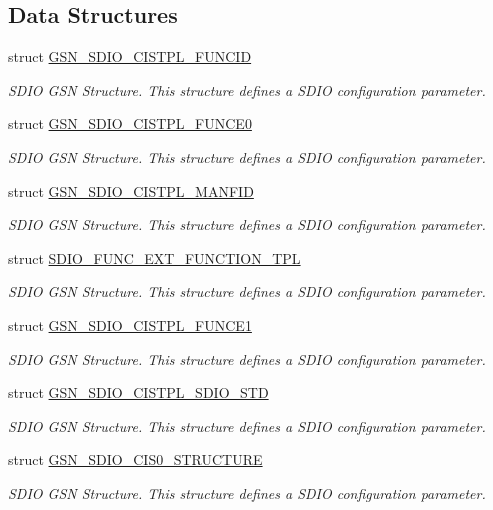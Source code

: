 \subsection*{Data Structures}
\begin{DoxyCompactItemize}
\item 
struct \hyperlink{a00221}{GSN\_\-SDIO\_\-CISTPL\_\-FUNCID}
\begin{DoxyCompactList}\small\item\em SDIO GSN Structure. This structure defines a SDIO configuration parameter. \end{DoxyCompactList}\item 
struct \hyperlink{a00219}{GSN\_\-SDIO\_\-CISTPL\_\-FUNCE0}
\begin{DoxyCompactList}\small\item\em SDIO GSN Structure. This structure defines a SDIO configuration parameter. \end{DoxyCompactList}\item 
struct \hyperlink{a00222}{GSN\_\-SDIO\_\-CISTPL\_\-MANFID}
\begin{DoxyCompactList}\small\item\em SDIO GSN Structure. This structure defines a SDIO configuration parameter. \end{DoxyCompactList}\item 
struct \hyperlink{a00458}{SDIO\_\-FUNC\_\-EXT\_\-FUNCTION\_\-TPL}
\begin{DoxyCompactList}\small\item\em SDIO GSN Structure. This structure defines a SDIO configuration parameter. \end{DoxyCompactList}\item 
struct \hyperlink{a00220}{GSN\_\-SDIO\_\-CISTPL\_\-FUNCE1}
\begin{DoxyCompactList}\small\item\em SDIO GSN Structure. This structure defines a SDIO configuration parameter. \end{DoxyCompactList}\item 
struct \hyperlink{a00223}{GSN\_\-SDIO\_\-CISTPL\_\-SDIO\_\-STD}
\begin{DoxyCompactList}\small\item\em SDIO GSN Structure. This structure defines a SDIO configuration parameter. \end{DoxyCompactList}\item 
struct \hyperlink{a00217}{GSN\_\-SDIO\_\-CIS0\_\-STRUCTURE}
\begin{DoxyCompactList}\small\item\em SDIO GSN Structure. This structure defines a SDIO configuration parameter. \end{DoxyCompactList}\item 

\end{DoxyCompactItemize}
